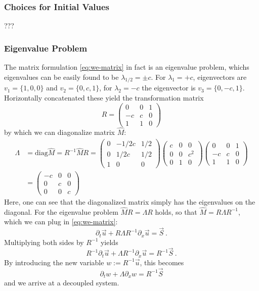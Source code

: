 \subsubsection{Choices for Initial Values}
???

\subsubsection{Eigenvalue Problem}
The matrix formulation \ref{eq:we-matrix} in fact is an eigenvalue problem, whichs eigenvalues can be easily found to be $\lambda_{1/2} = \pm c$. For $\lambda_1 = + c$, eigenvectors are $v_1 = \{1,0,0\}$ and $v_2 = \{0,c,1\}$, for $\lambda_2 = -c$ the eigenvector is $v_3 = \{0, -c, 1\}$.
Horizontally concatenated these yield the transformation matrix
\[  R =
\begin{pmatrix}
	0 & 0 & 1 \\
	-c & c & 0 \\
	1 & 1 & 0
\end{pmatrix}
\]
by which we can diagonalize matrix $\hat{M}$:
\begin{align*}
	\Lambda &= \text{diag} \hat{M} = R^{-1} \hat{M} R =
	\begin{pmatrix}
	0 & -1/2c & 1/2\\
	0 & 1/2c & 1/2 \\
	1 & 0 & 0
	\end{pmatrix}
	\begin{pmatrix}
		c & 0 & 0 \\
		0 & 0 & c^2 \\
		0 & 1 & 0
	\end{pmatrix}
	\begin{pmatrix}
		0 & 0 & 1 \\
		-c & c & 0 \\
		1 & 1 & 0
	\end{pmatrix} \\
 &=
 \begin{pmatrix}
 	-c & 0 & 0 \\
 	0 & c & 0 \\
 	0 & 0& c
 \end{pmatrix}
\end{align*}
Here, one can see that the diagonalized matrix simply has the eigenvalues on the diagonal.
For the eigenvalue problem $\hat{M} R = \Lambda R$ holds, so that $\hat{M} = R \Lambda R^{-1}$, which we can plug in \ref{eq:we-matrix}:
\begin{equation}
	\partial_t \vec{u} +  R \Lambda R^{-1} \partial_x \vec{u} = \vec{S}~.
\end{equation}
Multiplying both sides by $R^{-1}$ yields
\begin{equation}
	R^{-1} \partial_t \vec{u} +  \Lambda R^{-1} \partial_x \vec{u} = R^{-1} \vec{S}~.
\end{equation}
By introducing the new variable $w := R^{-1} \vec{u}$, this becomes
\begin{equation}
\partial_t w +  \Lambda \partial_x w = R^{-1} \vec{S}
\end{equation}
and we arrive at a decoupled system.
